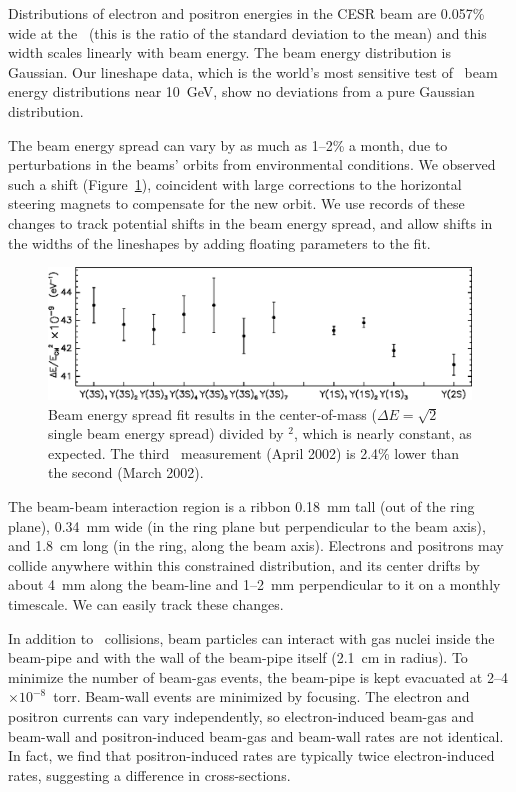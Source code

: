 \documentclass{cornell}
\begin{document}
Distributions of electron and positron energies in the CESR beam are
0.057\% wide at the \us\ (this is the ratio of the standard deviation
to the mean) and this width scales linearly with beam energy.  The
beam energy distribution is Gaussian.  Our lineshape data, which is
the world's most sensitive test of \ee\ beam energy distributions near
10~GeV, show no deviations from a pure Gaussian distribution.

The beam energy spread can vary by as much as 1--2\% a month, due to
perturbations in the beams' orbits from environmental conditions.  We
observed such a shift (Figure~\ref{beamenergyspread}), coincident with
large corrections to the horizontal steering magnets to compensate for
the new orbit.  We use records of these changes to track potential
shifts in the beam energy spread, and allow shifts in the widths of
the lineshapes by adding floating parameters to the
fit. \label{pag:beamenergyspread}

\begin{figure}[p]
  \begin{center}
    \includegraphics[width=\linewidth]{beamenergyspread}
  \end{center}
  \caption[Beam energy spread as a function of
  date]{\label{beamenergyspread} Beam energy spread fit results in the
  center-of-mass ($\Delta E = \sqrt{2}$ single beam energy spread)
  divided by \ecm$^2$, which is nearly constant, as expected.  The
  third \us\ measurement (April 2002) is 2.4\% lower than the second
  (March 2002).}
\end{figure}

The beam-beam interaction region is a ribbon 0.18~mm tall (out of the
ring plane), 0.34~mm wide (in the ring plane but perpendicular to the
beam axis), and 1.8~cm long (in the ring, along the beam axis).
Electrons and positrons may collide anywhere within this constrained
distribution, and its center drifts by about 4~mm along the beam-line
and 1--2~mm perpendicular to it on a monthly timescale.  We can easily
track these changes.

In addition to \ee\ collisions, beam particles can interact with gas
nuclei inside the beam-pipe and with the wall of the beam-pipe itself
(2.1~cm in radius).  To minimize the number of beam-gas events, the
beam-pipe is kept evacuated at 2--4$\times 10^{-8}$~torr.  Beam-wall
events are minimized by focusing.  The electron and positron currents
can vary independently, so electron-induced beam-gas and beam-wall and
positron-induced beam-gas and beam-wall rates are not identical.  In
fact, we find that positron-induced rates are typically twice
electron-induced rates, suggesting a difference in cross-sections.
\end{document}
